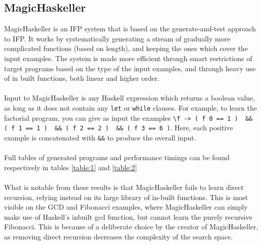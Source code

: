 \subsection{MagicHaskeller}
MagicHaskeller is an IFP system that is based on the generate-and-test approach to IFP. It works by systematically generating a stream of gradually more complicated functions (based on length), and keeping the ones which cover the input examples. The system is made more efficient through smart restrictions of target programs based on the type of the input examples, and through heavy use of in built functions, both linear and higher order. \\ \\
Input to MagicHaskeller is any Haskell expression which returns a boolean value, as long as it does not contain any \lstinline{let} or \lstinline{while} clauses. For example, to learn the factorial program, you can give as input the examples \lstinline{\f -> ( f 0 == 1 )  && ( f 1 == 1 )  && ( f 2 == 2 )  && ( f 3 == 6 )}. Here, each positive example is concatenated with \lstinline{&&} to produce the overall input.\\ \\
Full tables of generated programs and performance timings can be found respectively in tables \ref{table:1} and \ref{table:2} \\ \\
What is notable from these results is that MagicHaskeller fails to learn direct recursion, relying instead on its large library of in-built functions. This is most visible on the GCD and Fibonacci examples, where MagicHaskeller can simply make use of Haskell's inbuilt gcd function, but cannot learn the purely recursive Fibonacci. This is because of a deliberate choice by the creator of MagicHaskeller, as removing direct recursion decreases the complexity of the search space.

